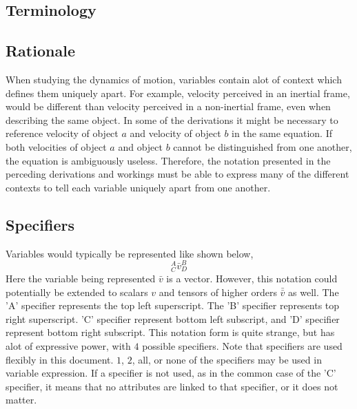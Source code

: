 \documentclass[a4paper, 12pt]{report}
\begin{document}
\begin{center}
\chapter{Terminology}
\begin{comment}
\end{comment}
\section{Rationale}
\begin{comment}
\end{comment}
When studying the dynamics of motion, variables contain alot of context which defines them uniquely apart. For example, velocity perceived in an inertial frame, would be different than velocity perceived in a non-inertial frame, even when describing the same object. In some of the derivations it might be necessary to reference velocity of object $a$ and velocity of object $b$ in the same equation. If both velocities of object $a$ and object $b$ cannot be distinguished from one another, the equation is ambiguously useless. Therefore, the notation presented in the perceding derivations and workings must be able to express many of the different contexts to tell each variable uniquely apart from one another.
\section{Specifiers}
\begin{comment}
\end{comment}
Variables would typically be represented like shown below,
$${}^{A}_{C}\bar{v}^{B}_{D}$$
Here the variable being represented $\bar{v}$ is a vector. However, this notation could potentially be extended to scalars $v$ and tensors of higher orders $\bar{\bar{v}}$ as well. The 'A' specifier represents the top left superscript. The 'B' specifier represents top right superscript. 'C' specifier represent bottom left subscript, and 'D' specifier represent bottom right subscript. This notation form is quite strange, but has alot of expressive power, with $4$ possible specifiers. Note that specifiers are used flexibly in this document. $1$, $2$, all, or none of the specifiers may be used in variable expression. If a specifier is not used, as in the common case of the 'C' specifier, it means that no attributes are linked to that specifier, or it does not matter. 

\end{center}
\end{document}
